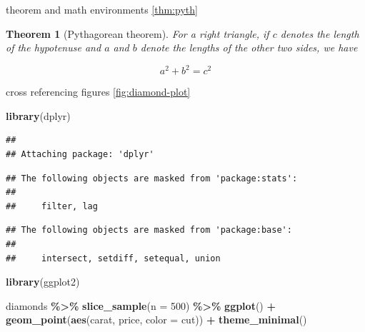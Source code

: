 \documentclass[]{interact}
\theoremstyle{plain}%
\newtheorem{theorem}{Theorem}[section]
\theoremstyle{definition}
\theoremstyle{remark}
\newenvironment{Shaded}{\begin{snugshade}}{\end{snugshade}}
\newcommand{\DataTypeTok}[1]{\textcolor[rgb]{0.13,0.29,0.53}{#1}}
\newcommand{\DecValTok}[1]{\textcolor[rgb]{0.00,0.00,0.81}{#1}}
\newcommand{\KeywordTok}[1]{\textcolor[rgb]{0.13,0.29,0.53}{\textbf{#1}}}
\newcommand{\NormalTok}[1]{#1}
\newcommand{\OperatorTok}[1]{\textcolor[rgb]{0.81,0.36,0.00}{\textbf{#1}}}
\newcommand{\StringTok}[1]{\textcolor[rgb]{0.31,0.60,0.02}{#1}}
\begin{document}
theorem and math environments \ref{thm:pyth}

\begin{theorem}[Pythagorean theorem]
\protect\hypertarget{thm:pyth}{}{\label{thm:pyth} {} }For a right triangle, if \(c\) denotes the length of the hypotenuse
and \(a\) and \(b\) denote the lengths of the other two sides, we have

\[a^2 + b^2 = c^2\]
\end{theorem}

cross referencing figures \ref{fig:diamond-plot}

\begin{Shaded}
\begin{Highlighting}[]
\KeywordTok{library}\NormalTok{(dplyr)}
\end{Highlighting}
\end{Shaded}

\begin{verbatim}
## 
## Attaching package: 'dplyr'
\end{verbatim}

\begin{verbatim}
## The following objects are masked from 'package:stats':
## 
##     filter, lag
\end{verbatim}

\begin{verbatim}
## The following objects are masked from 'package:base':
## 
##     intersect, setdiff, setequal, union
\end{verbatim}

\begin{Shaded}
\begin{Highlighting}[]
\KeywordTok{library}\NormalTok{(ggplot2)}

\NormalTok{diamonds }\OperatorTok{\%\textgreater{}\%}\StringTok{ }
\StringTok{  }\KeywordTok{slice\_sample}\NormalTok{(}\DataTypeTok{n =} \DecValTok{500}\NormalTok{) }\OperatorTok{\%\textgreater{}\%}
\StringTok{  }\KeywordTok{ggplot}\NormalTok{() }\OperatorTok{+}\StringTok{ }
\StringTok{  }\KeywordTok{geom\_point}\NormalTok{(}\KeywordTok{aes}\NormalTok{(carat, price, }\DataTypeTok{color =}\NormalTok{ cut)) }\OperatorTok{+}\StringTok{ }
\StringTok{  }\KeywordTok{theme\_minimal}\NormalTok{()}
\end{Highlighting}
\end{Shaded}
\end{document}
